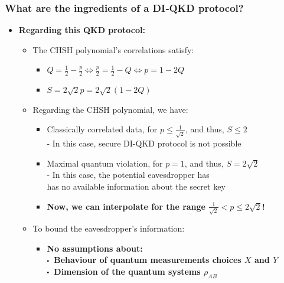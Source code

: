 \documentclass{beamer}
\newcommand\sbullet[1][.5]{\mathbin{\vcenter{\hbox{\scalebox{#1}{$\bullet$}}}}}
\begin{document}
		\begin{frame}
			\frametitle{\large What are the ingredients of a DI‑QKD protocol?}

            \vspace{3ex}
            \begin{itemize}
                \item \textbf{Regarding this QKD protocol:}
                \begin{itemize}
                    \item The CHSH polynomial's correlations satisfy:
                    \begin{itemize}
                        \item $Q = \frac{1}{2} - \frac{p}{2} \Leftrightarrow \frac{p}{2} = \frac{1}{2} - Q \Leftrightarrow p = 1 - 2Q$
                        \item $S = 2 \sqrt{2} p = 2 \sqrt{2} (1 - 2Q)$
                    \end{itemize}
                    \vspace{1ex}
                    \item Regarding the CHSH polynomial, we have:
                    \begin{itemize}
                        \item Classically correlated data, for $p \leq \frac{1}{\sqrt{2}}$, and thus, $S \leq 2$\\
                        - In this case, secure DI-QKD protocol is not possible
                        \item Maximal quantum violation, for $p = 1$, and thus, $S = 2\sqrt{2}$\\
                        - In this case, the potential eavesdropper has\\\hspace{0.5em}has no available information about the secret key
                        \vspace{0.75ex}
                        \item \textbf{Now, we can interpolate for the range $\frac{1}{\sqrt{2}} < p \leq 2\sqrt{2}$!}
                    \end{itemize}
                    \vspace{1ex}
                    \item To bound the eavesdropper's information:
                    \begin{itemize}
                        \item \textbf{No assumptions about:}\\
                        \footnotesize
                        $\sbullet$\, \textbf{Behaviour of quantum measurements choices $X$ and $Y$}\\
                        $\sbullet$\, \textbf{Dimension of the quantum systems ${\rho}_{AB}$}
                    \end{itemize}
                \end{itemize}
            \end{itemize}
		\end{frame}
\end{document}
